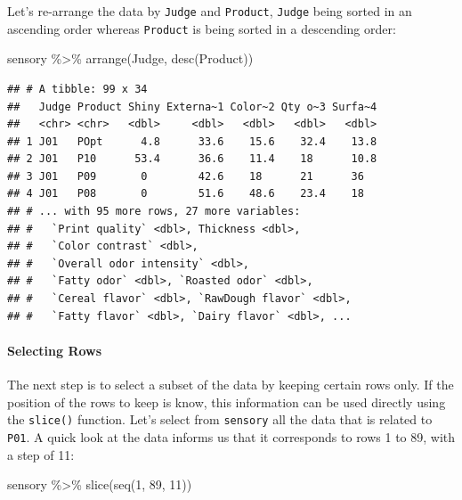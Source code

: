 \documentclass[
]{krantz}
\makeatletter
\newenvironment{Shaded}{\begin{snugshade}}{\end{snugshade}}
\newcommand{\DecValTok}[1]{\textcolor[rgb]{0.06,0.06,0.06}{#1}}
\newcommand{\FunctionTok}[1]{\textcolor[rgb]{0,0,0}{#1}}
\newcommand{\NormalTok}[1]{#1}
\newcommand{\SpecialCharTok}[1]{\textcolor[rgb]{0,0,0}{#1}}
\newenvironment{kframe}{%
\medskip{}
\setlength{\fboxsep}{.8em}
 \def\at@end@of@kframe{}%
 \ifinner\ifhmode%
  \def\at@end@of@kframe{\end{minipage}}%
  \begin{minipage}{\columnwidth}%
 \fi\fi%
 \def\FrameCommand##1{\hskip\@totalleftmargin \hskip-\fboxsep
 \colorbox{shadecolor}{##1}\hskip-\fboxsep
     \hskip-\linewidth \hskip-\@totalleftmargin \hskip\columnwidth}%
 \MakeFramed {\advance\hsize-\width
   \@totalleftmargin\z@ \linewidth\hsize
   \@setminipage}}%
 {\par\unskip\endMakeFramed%
 \at@end@of@kframe}
\renewenvironment{Shaded}{\begin{kframe}}{\end{kframe}}
\makeatother
\begin{document}
Let's re-arrange the data by \texttt{Judge} and \texttt{Product}, \texttt{Judge} being sorted in an ascending order whereas \texttt{Product} is being sorted in a descending order:

\begin{Shaded}
\begin{Highlighting}[]
\NormalTok{sensory }\SpecialCharTok{\%\textgreater{}\%}
  \FunctionTok{arrange}\NormalTok{(Judge, }\FunctionTok{desc}\NormalTok{(Product))}
\end{Highlighting}
\end{Shaded}

\begin{verbatim}
## # A tibble: 99 x 34
##   Judge Product Shiny Externa~1 Color~2 Qty o~3 Surfa~4
##   <chr> <chr>   <dbl>     <dbl>   <dbl>   <dbl>   <dbl>
## 1 J01   POpt      4.8      33.6    15.6    32.4    13.8
## 2 J01   P10      53.4      36.6    11.4    18      10.8
## 3 J01   P09       0        42.6    18      21      36  
## 4 J01   P08       0        51.6    48.6    23.4    18  
## # ... with 95 more rows, 27 more variables:
## #   `Print quality` <dbl>, Thickness <dbl>,
## #   `Color contrast` <dbl>,
## #   `Overall odor intensity` <dbl>,
## #   `Fatty odor` <dbl>, `Roasted odor` <dbl>,
## #   `Cereal flavor` <dbl>, `RawDough flavor` <dbl>,
## #   `Fatty flavor` <dbl>, `Dairy flavor` <dbl>, ...
\end{verbatim}

\hypertarget{selecting-rows}{%
\paragraph*{Selecting Rows}\label{selecting-rows}}

The next step is to select a subset of the data by keeping certain rows only. If the position of the rows to keep is know, this information can be used directly using the \texttt{slice()} function. Let's select from \texttt{sensory} all the data that is related to \texttt{P01}. A quick look at the data informs us that it corresponds to rows 1 to 89, with a step of 11:

\begin{Shaded}
\begin{Highlighting}[]
\NormalTok{sensory }\SpecialCharTok{\%\textgreater{}\%}
  \FunctionTok{slice}\NormalTok{(}\FunctionTok{seq}\NormalTok{(}\DecValTok{1}\NormalTok{, }\DecValTok{89}\NormalTok{, }\DecValTok{11}\NormalTok{))}
\end{Highlighting}
\end{Shaded}
\end{document}
